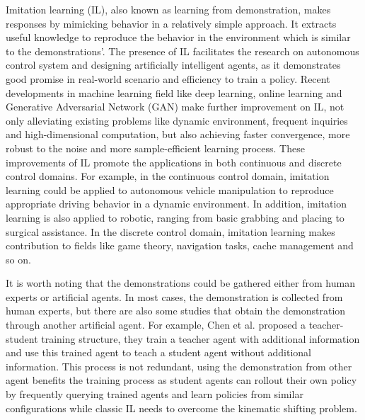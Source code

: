 \documentclass[acmsmall]{acmart}
\begin{document}
Imitation learning (IL), also known as learning from demonstration, makes responses by mimicking behavior in a relatively simple approach. It extracts useful knowledge to reproduce the behavior in the environment which is similar to the demonstrations'. 
The presence of IL facilitates the research on autonomous control system and designing artificially intelligent agents, as it demonstrates good promise in real-world scenario and efficiency to train a policy. 
Recent developments in machine learning field like deep learning, online learning and Generative Adversarial Network (GAN)\hspace{1pt}\cite{goodfellow2014generative} make further improvement on IL, not only alleviating existing problems like dynamic environment, frequent inquiries and high-dimensional computation, but also achieving faster convergence, more robust to the noise and more sample-efficient learning process. These improvements of IL promote the applications in both continuous and discrete control domains. 
For example, in the continuous control domain, imitation learning could be applied to autonomous vehicle manipulation to reproduce appropriate driving behavior in a dynamic environment\cite{pomerleauALVINNAutonomousLand1989,pomerleauEfficientTrainingArtificial1991,georgeImitationLearningEnd2018,kebriaDeepImitationLearning2020,zhouModelingCarFollowingBehaviors2020,codevillaEndtoEndDrivingConditional2018,chenLearningCheating2019,buhlerDrivingGhostsBehavioral2020}. In addition, imitation learning is also applied to robotic, ranging from basic grabbing and placing to surgical assistance\cite{finnGuidedCostLearning2016,lioutikovLearningMovementPrimitive2017,osaOnlineTrajectoryPlanning2014,osaOnlineTrajectoryPlanning2018,nairCombiningSelfSupervisedLearning2017,sunDeeplyAggreVaTeDDifferentiable2017,zhangDeepImitationLearning2018,osaGuidingTrajectoryOptimization2017}. In the discrete control domain, imitation learning makes contribution to fields like game theory\cite{rossEfficientReductionsImitation2010,hesterDeepQlearningDemonstrations2017,aytarPlayingHardExploration2018,edwardsImitatingLatentPolicies2019}, navigation tasks\cite{husseinDeepImitationLearning2018,wangRobustImitationDiverse2017,shouOptimalPassengerseekingPolicies2020}, cache management\cite{liu2020imitationcache} and so on. 

It is worth noting that the demonstrations could be gathered either from human experts or artificial agents. In most cases, the demonstration is collected from human experts, but there are also some studies that obtain the demonstration through another artificial agent. For example, Chen et al.\cite{chenLearningCheating2019} proposed a teacher-student training structure, they train a teacher agent with additional information and use this trained agent to teach a student agent without additional information. This process is not redundant, using the demonstration from other agent benefits the training process as student agents can rollout their own policy by frequently querying trained agents and learn policies from similar configurations while classic IL needs to overcome the kinematic shifting problem.
\end{document}
